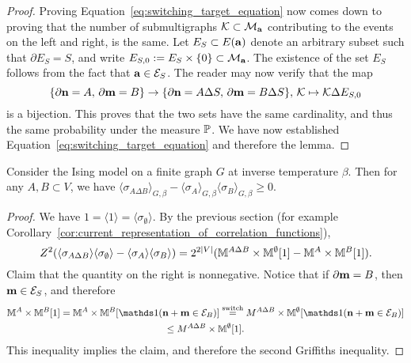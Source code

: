 \begin{proof}
    Proving Equation~\eqref{eq:switching_target_equation} now comes down to
    proving that the number of submultigraphs $\calK\subset\calM_\a$ contributing
    to the events on the left and right, is the same.
    Let $E_S\subset E(\a)$ denote an arbitrary subset such that $\partial E_S=S$,
    and write $E_{S,0}:=E_S\times\{0\}\subset\calM_\a$.
    The existence of the set $E_S$ follows from the fact that $\a\in\calE_S$.
    The reader may now verify that the map
    \[
        \{\partial\n=A,\,\partial\m=B\}
        \to
        \{\partial\n=A\Delta S,\,\partial\m=B\Delta S\}
        ,\,
        \calK\mapsto \calK\Delta E_{S,0}
    \]
    is a bijection.
    This proves that the two sets have the same cardinality,
    and thus the same probability under the measure $\P$.
    We have now established Equation~\eqref{eq:switching_target_equation}
    and therefore the lemma.
\end{proof}

\begin{corollary}
    Consider the Ising model on a finite graph $G$ at inverse temperature $\beta$.
    Then for any $A,B\subset V$, we have
    $\langle\sigma_{A\Delta B}\rangle_{G,\beta}-\langle\sigma_A\rangle_{G,\beta}\langle\sigma_B\rangle_{G,\beta}\geq 0$.
\end{corollary}

\begin{proof}
    We have $1=\langle1\rangle=\langle\sigma_\emptyset\rangle$.
    By the previous section (for example Corollary~\ref{cor:current_representation_of_correlation_functions}),
    \[
    Z^2
    (\langle\sigma_{A\Delta B}\rangle\langle\sigma_\emptyset\rangle-\langle\sigma_A\rangle\langle\sigma_B\rangle)
    =
    2^{2|V|}
    (
    \M^{A\Delta B}\times\M^\emptyset[1]
    -
    \M^A\times\M^B[1]
    ).
    \]
    Claim that the quantity on the right is nonnegative.
    Notice that if $\partial\m= B$, then $\m\in\calE_S$,
    and therefore
    \begin{multline}
        \M^A\times\M^B[1]
        =
        \M^A\times\M^B[\true{\n+\m\in\calE_B}]
        \stackrel{\text{switch}}=
        M^{A\Delta B}\times\M^\emptyset[\true{\n+\m\in\calE_B}]
        \\
        \leq
        M^{A\Delta B}\times\M^\emptyset[1].
    \end{multline}
    This inequality implies the claim, and therefore the second Griffiths inequality.
\end{proof}


